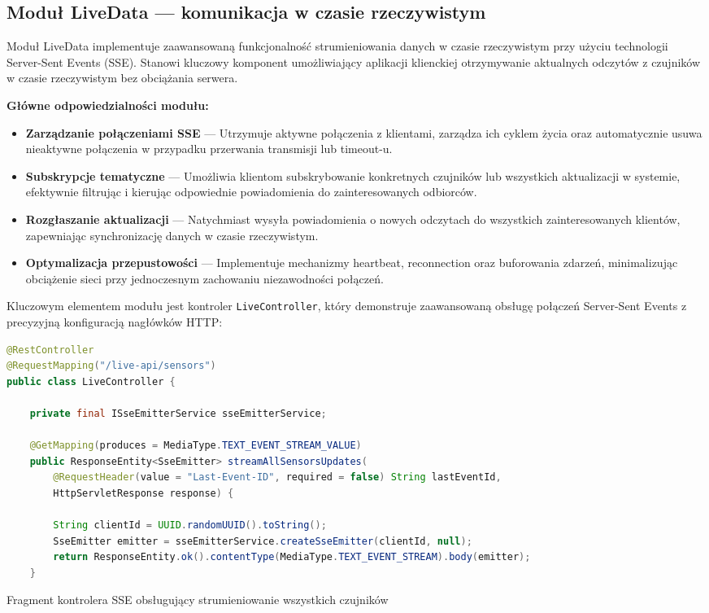 \documentclass[a4paper,12pt,openany]{book}
\begin{document}
\subsection{Moduł LiveData --- komunikacja w czasie rzeczywistym}

Moduł LiveData implementuje zaawansowaną funkcjonalność strumieniowania danych w czasie rzeczywistym przy użyciu technologii Server-Sent Events (SSE). Stanowi kluczowy komponent umożliwiający aplikacji klienckiej otrzymywanie aktualnych odczytów z czujników w czasie rzeczywistym bez obciążania serwera.

\textbf{Główne odpowiedzialności modułu:}
\begin{itemize}[itemsep=2pt,topsep=0pt,parsep=0pt]
\vspace{0.5em}
\item \textbf{Zarządzanie połączeniami SSE} --- Utrzymuje aktywne połączenia z klientami, zarządza ich cyklem życia oraz automatycznie usuwa nieaktywne połączenia w przypadku przerwania transmisji lub timeout-u.

\item \textbf{Subskrypcje tematyczne} --- Umożliwia klientom subskrybowanie konkretnych czujników lub wszystkich aktualizacji w systemie, efektywnie filtrując i kierując odpowiednie powiadomienia do zainteresowanych odbiorców.

\item \textbf{Rozgłaszanie aktualizacji} --- Natychmiast wysyła powiadomienia o nowych odczytach do wszystkich zainteresowanych klientów, zapewniając synchronizację danych w czasie rzeczywistym.

\item \textbf{Optymalizacja przepustowości} --- Implementuje mechanizmy heartbeat, reconnection oraz buforowania zdarzeń, minimalizując obciążenie sieci przy jednoczesnym zachowaniu niezawodności połączeń.
\end{itemize}

Kluczowym elementem modułu jest kontroler \texttt{LiveController}, który demonstruje zaawansowaną obsługę połączeń Server-Sent Events z precyzyjną konfiguracją nagłówków HTTP:

\begin{lstfloat}[H]
\begin{lstlisting}[language=java]
@RestController
@RequestMapping("/live-api/sensors")
public class LiveController {

    private final ISseEmitterService sseEmitterService;

    @GetMapping(produces = MediaType.TEXT_EVENT_STREAM_VALUE)
    public ResponseEntity<SseEmitter> streamAllSensorsUpdates(
        @RequestHeader(value = "Last-Event-ID", required = false) String lastEventId,
        HttpServletResponse response) {

        String clientId = UUID.randomUUID().toString();
        SseEmitter emitter = sseEmitterService.createSseEmitter(clientId, null);
        return ResponseEntity.ok().contentType(MediaType.TEXT_EVENT_STREAM).body(emitter);
    }
\end{lstlisting}
\caption{Fragment kontrolera SSE obsługujący strumieniowanie wszystkich czujników}
\label{lst:live-controller}
\end{lstfloat}
\end{document}
